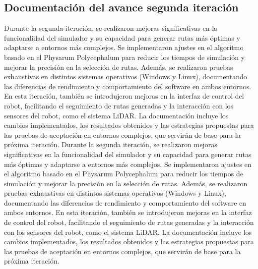 \subsection{Documentaci\'on del avance segunda iteraci\'on}
    Durante la segunda iteraci\'on, se realizaron mejoras
        significativas en la funcionalidad del simulador y su
        capacidad para generar rutas m\'as \'optimas y adaptarse a
        entornos m\'as complejos. Se implementaron ajustes en el
        algoritmo basado en el Physarum Polycephalum para reducir
        los tiempos de simulaci\'on y mejorar la precisi\'on en la
        selecci\'on de rutas. Adem\'as, se realizaron pruebas
        exhaustivas en distintos sistemas operativos (Windows y
        Linux), documentando las diferencias de rendimiento y
        comportamiento del software en ambos entornos.
    \vskip 0.5cm
    En esta iteraci\'on, tambi\'en se introdujeron mejoras en la
        interfaz de control del robot, facilitando el seguimiento de
        rutas generadas y la interacci\'on con los sensores del robot,
        como el sistema LiDAR. La documentaci\'on incluye los
        cambios implementados, los resultados obtenidos y las
        estrategias propuestas para las pruebas de aceptaci\'on en
        entornos complejos, que servir\'an de base para la pr\'oxima
        iteraci\'on.
    \vskip 0.5cm
    Durante la segunda iteraci\'on, se realizaron mejoras
        significativas en la funcionalidad del simulador y su
        capacidad para generar rutas m\'as \'optimas y adaptarse a
        entornos m\'as complejos. Se implementaron ajustes en el
        algoritmo basado en el Physarum Polycephalum para reducir
        los tiempos de simulaci\'on y mejorar la precisi\'on en la
        selecci\'on de rutas. Adem\'as, se realizaron pruebas
        exhaustivas en distintos sistemas operativos (Windows y
        Linux), documentando las diferencias de rendimiento y
        comportamiento del software en ambos entornos.
    \vskip 0.5cm
    En esta iteraci\'on, tambi\'en se introdujeron mejoras en la
        interfaz de control del robot, facilitando el seguimiento de
        rutas generadas y la interacci\'on con los sensores del robot,
        como el sistema LiDAR. La documentaci\'on incluye los
        cambios implementados, los resultados obtenidos y las
        estrategias propuestas para las pruebas de aceptaci\'on en
        entornos complejos, que servir\'an de base para la pr\'oxima
        iteraci\'on.